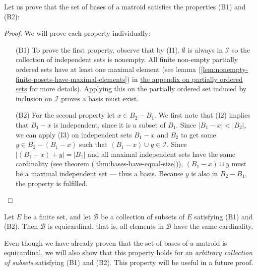 Let us prove that the set of bases of a matroid satisfies the properties (B1) and (B2):
\begin{proof} We will prove each property individually:
    \begin{enumerate}
        \item[(B1)] 
            To prove the first property, observe that by (I1), $\emptyset$ is always in $\mathcal{I}$ so the collection of independent sets is nonempty. All finite non-empty partially ordered sets have at least one maximal element (see lemma (\ref{lem:nonempty-finite-posets-have-maximal-elements}) in \hyperref[sec:appendix-poset]{the appendix on partially ordered sets} for more details). Applying this on the partially ordered set induced by inclusion on $\mathcal I$ proves a basis must exist.
        \item[(B2)]
          For the second property let $x\in B_2 - B_1$. We first note that (I2) implies that $B_1 - x$ is independent, since it is a subset of $B_1$. Since $|B_1-x|<|B_2|$, we can apply (I3) on independent sets $B_1-x$ and $B_2$ to get some $y\in B_2-(B_1-x)$ such that $(B_1-x)\cup y \in\mathcal{I}$. Since $|(B_1-x) + y|=|B_1|$ and all maximal independent sets have the same cardinality (see theorem (\ref{thm:bases-have-equal-size})), $(B_1-x)\cup y$ must be a maximal independent set --- thus a basis. Because $y$ is also in $B_2-B_1$, the property is fulfilled.
    \end{enumerate}
\end{proof} 



\begin{lemma}\label{lem:basis-axioms-imply-equal-size}
    Let $E$ be a finite set, and let $\mathcal{B}$ be a collection of subsets of $E$ satisfying (B1) and (B2). Then $\mathcal{B}$ is equicardinal, that is, all elements in $\mathcal{B}$ have the same cardinality.
\end{lemma}

Even though we have already proven that the set of bases of a matroid is equicardinal, we will also show that this property holds for an \textit{arbitrary collection of subsets} satisfying (B1) and (B2). This property will be useful in a future proof.



